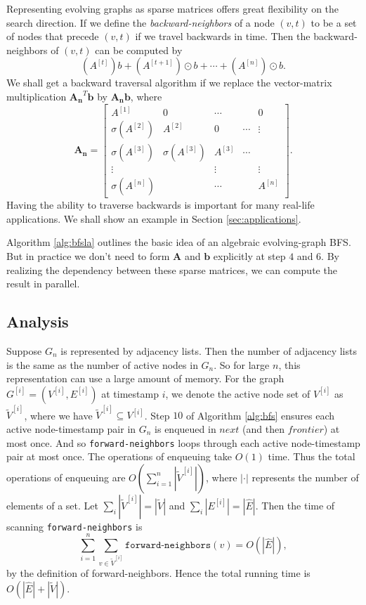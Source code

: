 \documentclass[11pt, conference, , compsocconf]{IEEEtran}
\theoremstyle{definition}
\begin{document}
Representing evolving graphs as sparse matrices offers great flexibility 
on the search direction. If we define the \emph{backward-neighbors} of a 
node $(v,t)$ to be a set of nodes that precede $(v,t)$ if we travel backwards
in time. Then the backward-neighbors of $(v,t)$ can be computed by
\begin{equation}
\label{eq:backward}
(A^{[t]})b + (A^{[t+1]})\odot b + \cdots + (A^{[n]})\odot b.
\end{equation}
We shall get a backward traversal algorithm if we replace
the vector-matrix multiplication $\bm{A_n}^T\bm{b}$ 
by $\bm{A_n}\bm{b}$, where 
\[
\bm{A_n} = 
\begin{bmatrix}
A^{[1]} &   0            & \cdots  &  & 0 \\
\sigma(A^{[2]}) & A^{[2]} & 0         &\cdots  & \vdots \\
\sigma(A^{[3]}) & \sigma(A^{[3]}) & A^{[3]} & \cdots \\
   \vdots              &                              &      \vdots            &  &  \vdots \\
\sigma(A^{[n]}) &                  &       \cdots                      &  & A^{[n]} 
\end{bmatrix}.
\]
Having the ability to traverse backwards is important for many real-life applications. 
We shall show an example in Section \ref{sec:applications}.

Algorithm \ref{alg:bfsla} outlines the basic idea of an algebraic evolving-graph BFS.
But in practice we don't need to form $\bm{A}$ and $\bm{b}$ explicitly at step $4$ and $6$. By realizing the dependency between these sparse matrices, 
we can compute  the result in parallel. 

\subsection{Analysis}
\label{sec:analysis}

Suppose $G_n$ is represented by adjacency lists.
Then the number of adjacency lists is the same as the number
of active nodes in $G_n$. So for large $n$, this representation 
can use a large amount of memory.
For the graph $G^{[i]} = (V^{[i]}, E^{[i]})$ at timestamp $i$, 
we denote the active node set of $V^{[i]}$ as $\tilde V^{[i]}$, 
where we have $\tilde V^{[i]} \subseteq V^{[i]}$.
Step $10$ of  Algorithm \ref{alg:bfs} ensures each active node-timestamp pair in $G_n$ is enqueued in $next$ (and then $frontier$) at most once. 
And so \texttt{forward-neighbors} loops through each 
active node-timestamp pair at most once. 
The operations of enqueuing take $O(1)$ time.
Thus the total operations of enqueuing are 
$O(\sum_{i=1}^n|\tilde V^{[i]}|)$, where $|\cdot|$ represents the number of elements of a set.  Let $\sum_i |\tilde V^{[i]}| = |\tilde V|$ and $\sum_i |E^{[i]}| = |\hat E|$.
Then the time of scanning
\texttt{forward-neighbors} is 
\[
\sum_{i=1}^n\sum_{v \in \tilde V^{[i]}} \texttt{forward-neighbors}(v) = 
O(|\hat E|),
\]
by the definition of forward-neighbors.
Hence the total running time is $O(|\hat E|+ |\tilde V|)$.
\end{document}
